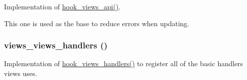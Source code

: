 Implementation of \hyperlink{group__views__hooks_gc67ffd4a2f61f9814ee37b541c472c47}{hook\_\-views\_\-api()}.

This one is used as the base to reduce errors when updating. \hypertarget{handlers_8inc_aa860496d6ea85a62caa4e23557e55fa}{
\subsubsection[{views\_\-views\_\-handlers}]{\setlength{\rightskip}{0pt plus 5cm}views\_\-views\_\-handlers ()}}
\label{handlers_8inc_aa860496d6ea85a62caa4e23557e55fa}


Implementation of \hyperlink{group__views__hooks_gbf506f44bd8d8a86876f27396f5341ed}{hook\_\-views\_\-handlers()} to register all of the basic handlers views uses. 